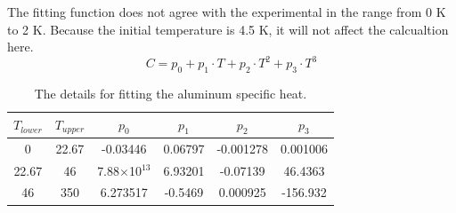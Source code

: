 The fitting function does not agree with the experimental in the range from 0 K to 2 K.
Because the initial temperature is 4.5 K, it will not affect the calcualtion here.
\begin{equation}
 C = p_0 + p_1 \cdot T + p_2 \cdot T^2 + p_3 \cdot T^3
\end{equation}
\begin{table}[H]
 \centering
 \begin{tabular}{cccccc} \hline \hline
 $T_{lower}$ & $T_{upper}$ & $p_0$ & $p_1$ & $p_2$ & $p_3$ \\ \hline
 0 & 22.67 & -0.03446 & 0.06797 & -0.001278 & 0.001006 \\
 22.67 & 46 & 7.88$\times$10$^{13}$ & 6.93201 & -0.07139 & 46.4363 \\
 46 & 350 & 6.273517 & -0.5469 & 0.000925 & -156.932 \\ \hline \hline
 \end{tabular}
 \caption{The details for fitting the aluminum specific heat.}
 \label{4alsh}
\end{table}
